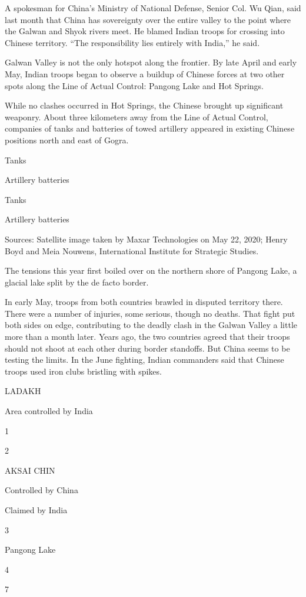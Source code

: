 A spokesman for China's Ministry of National Defense, Senior Col. Wu
Qian, said last month that China has sovereignty over the entire valley
to the point where the Galwan and Shyok rivers meet. He blamed Indian
troops for crossing into Chinese territory. ``The responsibility lies
entirely with India,'' he said.

Galwan Valley is not the only hotspot along the frontier. By late April
and early May, Indian troops began to observe a buildup of Chinese
forces at two other spots along the Line of Actual Control: Pangong Lake
and Hot Springs.

While no clashes occurred in Hot Springs, the Chinese brought up
significant weaponry. About three kilometers away from the Line of
Actual Control, companies of tanks and batteries of towed artillery
appeared in existing Chinese positions north and east of Gogra.

Tanks

Artillery batteries

Tanks

Artillery batteries

Sources: Satellite image taken by Maxar Technologies on May 22, 2020;
Henry Boyd and Meia Nouwens, International Institute for Strategic
Studies.

The tensions this year first boiled over on the northern shore of
Pangong Lake, a glacial lake split by the de facto border.

In early May, troops from both countries brawled in disputed territory
there. There were a number of injuries, some serious, though no deaths.
That fight put both sides on edge, contributing to the deadly clash in
the Galwan Valley a little more than a month later. Years ago, the two
countries agreed that their troops should not shoot at each other during
border standoffs. But China seems to be testing the limits. In the June
fighting, Indian commanders said that Chinese troops used iron clubs
bristling with spikes.

LADAKH

Area controlled by India

1

2

AKSAI CHIN

Controlled by China

Claimed by India

3

Pangong Lake

4

7

